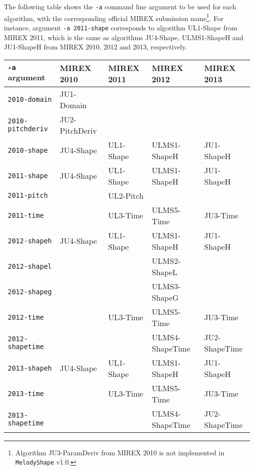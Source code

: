 \documentclass[twoside]{article}
\begin{document}
The following table shows the \texttt{-a} command line argument to be used for each algorithm, with the corresponding official MIREX submission name\footnote{Algorithm \textsf{JU3-ParamDeriv} from MIREX 2010 is not implemented in \texttt{MelodyShape} v1.0.}. For instance, argument \texttt{-a 2011-shape} corresponds to algorithm \textsf{UL1-Shape} from MIREX 2011, which is the same as algorithms \textsf{JU4-Shape}, \textsf{ULMS1-ShapeH} and \textsf{JU1-ShapeH} from MIREX 2010, 2012 and 2013, respectively.

\begin{table}[!h]
\centering\begin{tabular}{l|llll}
	\hline
	\texttt{-a} argument     & MIREX 2010              & MIREX 2011         & MIREX 2012               & MIREX 2013             \\ \hline
	\texttt{2010-domain}     & \textsf{JU1-Domain}     &                    &                          &  \\
	\texttt{2010-pitchderiv} & \textsf{JU2-PitchDeriv} &                    &                          &  \\
	\texttt{2010-shape}      & \textsf{JU4-Shape}      & \textsf{UL1-Shape} & \textsf{ULMS1-ShapeH}    & \textsf{JU1-ShapeH}    \\ \hline
	\texttt{2011-shape}      & \textsf{JU4-Shape}      & \textsf{UL1-Shape} & \textsf{ULMS1-ShapeH}    & \textsf{JU1-ShapeH}    \\
	\texttt{2011-pitch}      &                         & \textsf{UL2-Pitch} &                          &  \\
	\texttt{2011-time}       &                         & \textsf{UL3-Time}  & \textsf{ULMS5-Time}      & \textsf{JU3-Time}      \\ \hline
	\texttt{2012-shapeh}     & \textsf{JU4-Shape}      & \textsf{UL1-Shape} & \textsf{ULMS1-ShapeH}    & \textsf{JU1-ShapeH}    \\
	\texttt{2012-shapel}     &                         &                    & \textsf{ULMS2-ShapeL}    &  \\
	\texttt{2012-shapeg}     &                         &                    & \textsf{ULMS3-ShapeG}    &  \\
	\texttt{2012-time}       &                         & \textsf{UL3-Time}  & \textsf{ULMS5-Time}      & \textsf{JU3-Time}      \\
	\texttt{2012-shapetime}  &                         &                    & \textsf{ULMS4-ShapeTime} & \textsf{JU2-ShapeTime} \\ \hline
	\texttt{2013-shapeh}     & \textsf{JU4-Shape}      & \textsf{UL1-Shape} & \textsf{ULMS1-ShapeH}    & \textsf{JU1-ShapeH}    \\
	\texttt{2013-time}       &                         & \textsf{UL3-Time}  & \textsf{ULMS5-Time}      & \textsf{JU3-Time}      \\
	\texttt{2013-shapetime}  &                         &                    & \textsf{ULMS4-ShapeTime} & \textsf{JU2-ShapeTime} \\ \hline
\end{tabular}
\end{table}
\end{document}

